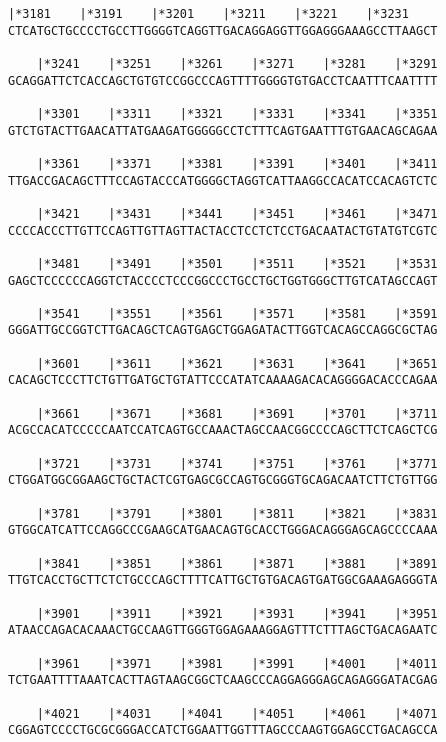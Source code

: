 \documentclass{article}
\begin{document}
\begin{Verbatim}[fontfamily=courier]
    |*3181    |*3191    |*3201    |*3211    |*3221    |*3231
CTCATGCTGCCCCTGCCTTGGGGTCAGGTTGACAGGAGGTTGGAGGGAAAGCCTTAAGCT

    |*3241    |*3251    |*3261    |*3271    |*3281    |*3291
GCAGGATTCTCACCAGCTGTGTCCGGCCCAGTTTTGGGGTGTGACCTCAATTTCAATTTT

    |*3301    |*3311    |*3321    |*3331    |*3341    |*3351
GTCTGTACTTGAACATTATGAAGATGGGGGCCTCTTTCAGTGAATTTGTGAACAGCAGAA

    |*3361    |*3371    |*3381    |*3391    |*3401    |*3411
TTGACCGACAGCTTTCCAGTACCCATGGGGCTAGGTCATTAAGGCCACATCCACAGTCTC

    |*3421    |*3431    |*3441    |*3451    |*3461    |*3471
CCCCACCCTTGTTCCAGTTGTTAGTTACTACCTCCTCTCCTGACAATACTGTATGTCGTC

    |*3481    |*3491    |*3501    |*3511    |*3521    |*3531
GAGCTCCCCCCAGGTCTACCCCTCCCGGCCCTGCCTGCTGGTGGGCTTGTCATAGCCAGT

    |*3541    |*3551    |*3561    |*3571    |*3581    |*3591
GGGATTGCCGGTCTTGACAGCTCAGTGAGCTGGAGATACTTGGTCACAGCCAGGCGCTAG

    |*3601    |*3611    |*3621    |*3631    |*3641    |*3651
CACAGCTCCCTTCTGTTGATGCTGTATTCCCATATCAAAAGACACAGGGGACACCCAGAA

    |*3661    |*3671    |*3681    |*3691    |*3701    |*3711
ACGCCACATCCCCCAATCCATCAGTGCCAAACTAGCCAACGGCCCCAGCTTCTCAGCTCG

    |*3721    |*3731    |*3741    |*3751    |*3761    |*3771
CTGGATGGCGGAAGCTGCTACTCGTGAGCGCCAGTGCGGGTGCAGACAATCTTCTGTTGG

    |*3781    |*3791    |*3801    |*3811    |*3821    |*3831
GTGGCATCATTCCAGGCCCGAAGCATGAACAGTGCACCTGGGACAGGGAGCAGCCCCAAA

    |*3841    |*3851    |*3861    |*3871    |*3881    |*3891
TTGTCACCTGCTTCTCTGCCCAGCTTTTCATTGCTGTGACAGTGATGGCGAAAGAGGGTA

    |*3901    |*3911    |*3921    |*3931    |*3941    |*3951
ATAACCAGACACAAACTGCCAAGTTGGGTGGAGAAAGGAGTTTCTTTAGCTGACAGAATC

    |*3961    |*3971    |*3981    |*3991    |*4001    |*4011
TCTGAATTTTAAATCACTTAGTAAGCGGCTCAAGCCCAGGAGGGAGCAGAGGGATACGAG

    |*4021    |*4031    |*4041    |*4051    |*4061    |*4071
CGGAGTCCCCTGCGCGGGACCATCTGGAATTGGTTTAGCCCAAGTGGAGCCTGACAGCCA

\end{Verbatim}
\newpage
\end{document}
